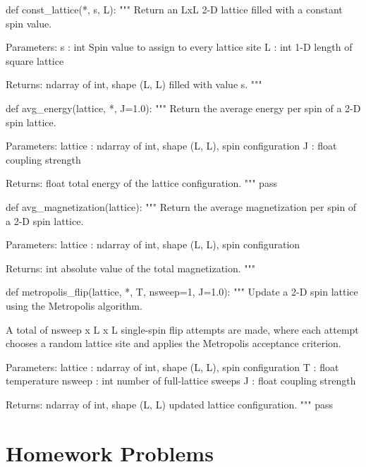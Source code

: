 \documentclass[12pt]{article}
\begin{document}
\begin{python}
  def const_lattice(*, s, L):
    """
    Return an LxL 2-D lattice filled with a constant spin value.

    Parameters:
      s : int Spin value to assign to every lattice site 
      L : int 1-D   length of square lattice

    Returns:
      ndarray of int, shape (L, L) filled with value s.
    """
\end{python}

\begin{python}
def avg_energy(lattice, *, J=1.0):
    """
    Return the average energy per spin of a 2-D spin lattice.

    Parameters:
      lattice : ndarray of int, shape (L, L), spin configuration
      J : float coupling strength

    Returns:
      float total energy of the lattice configuration.
    """
    pass
\end{python}      

\begin{python}
def avg_magnetization(lattice):
    """
    Return the average magnetization per spin of a 2-D spin lattice.

    Parameters:
      lattice : ndarray of int, shape (L, L), spin configuration

    Returns:
      int absolute value of the total magnetization.
    """
\end{python}      

\begin{python}
def metropolis_flip(lattice, *, T, nsweep=1, J=1.0):
    """
    Update a 2-D spin lattice using the Metropolis algorithm.

    A total of nsweep x L x L single-spin flip attempts are made,
    where each attempt chooses a random lattice site and applies the
    Metropolis acceptance criterion.

    Parameters:
      lattice : ndarray of int, shape (L, L), spin configuration
      T : float temperature
      nsweep : int number of full-lattice sweeps
      J : float coupling strength

    Returns:
      ndarray of int, shape (L, L) updated lattice configuration.
    """
    pass  
\end{python}


\section{Homework Problems}
\end{document}

